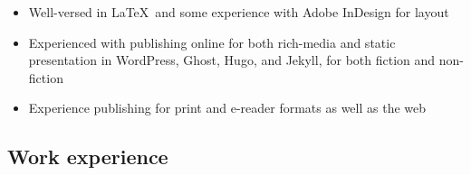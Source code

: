 \begin{itemize}
  \item Well-versed in \LaTeX\ and some experience with Adobe InDesign for layout
  \item Experienced with publishing online for both rich-media and static presentation in WordPress, Ghost, Hugo, and Jekyll, for both fiction and non-fiction
  \item Experience publishing for print and e-reader formats as well as the web
\end{itemize}

\newpage

\subsection{Work experience}


